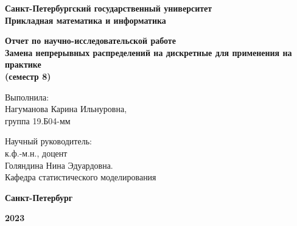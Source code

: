 
\begin{titlepage}
	\begin{center}
		
		\textbf{Санкт-Петербургский государственный университет\\Прикладная математика и информатика}
		
		\vspace{35mm}
	
		\textbf{\large  Отчет по научно-исследовательской работе } \\[8mm]
		\textbf{\large Замена непрерывных распределений на дискретные для применения на практике}\\ [8mm]
		\textbf{\large (семестр 8)}
		
		
		\vspace{20mm}

		\begin{flushright}
			{Выполнила:} \\
			Нагуманова Карина Ильнуровна, \\ группа 19.Б04-мм
		\end{flushright}
		\begin{flushright}
			{Научный руководитель:} \\
			к.ф.-м.н., доцент\\ Голяндина Нина Эдуардовна.\\ Кафедра статистического моделирования
		\end{flushright}
		
		\vfill 
		
		\textbf{Санкт-Петербург}
		\par{\textbf{2023}}
	\end{center}
\end{titlepage}

\restoregeometry
\addtocounter{page}{1}
